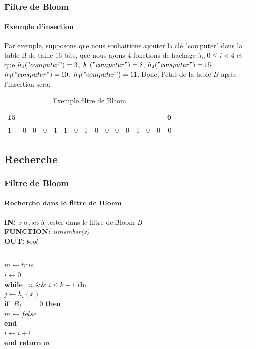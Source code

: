 \documentclass[hyperref={pdfpagemode=FullScreen,colorlinks=true},xcolor=pst,dvips]{beamer}\usepackage[french]{babel}
\begin{document}
	\begin{frame}
		\frametitle{Filtre de Bloom}
		\framesubtitle{Exemple d'insertion}
		Par exemple, supposons que nous souhaitions ajouter la clé "computer" dans la table B de taille 16 bits, que nous ayons 4 fonctions de hachage $ h_i, 0 \leq i < 4 $ et que $ h_0("computer") = 3$, $ h_1("computer") = 8$, $ h_2("computer") = 15$, $h_3("computer") = 10$, $h_4("computer") = 11 $. Donc, l'état de la table $ B $ après l'insertion sera:
	\begin{table}[!h]
		\centering		
		\begin{tabular}{|l|*{14}{c|}r|}
		\multicolumn{1}{c}{{\scriptsize 15}} &\multicolumn{1}{c}{}&\multicolumn{1}{c}{}&\multicolumn{1}{c}{}&\multicolumn{1}{c}{}&\multicolumn{1}{c}{}&\multicolumn{1}{c}{}&\multicolumn{1}{c}{}&\multicolumn{1}{c}{}&\multicolumn{1}{c}{}&\multicolumn{1}{c}{}&\multicolumn{1}{c}{}&\multicolumn{1}{c}{}&\multicolumn{1}{c}{}&\multicolumn{1}{c}{}&\multicolumn{1}{c}{{\scriptsize 0}}\\
		\hline
			1 & 0 & 0 & 0 & 1 & 1 & 0 & 1 & 0 & 0 & 0 & 0 & 1 & 0 & 0 & 0 \\
		\hline
		\end{tabular}
		\caption{Exemple filtre de Bloom}
	\end{table}
	\end{frame}
	\subsection{Recherche}
	\begin{frame}[shrink]
		\frametitle{Filtre de Bloom}
		\framesubtitle{Recherche dans le filtre de Bloom}
		\begin{framed}
		\textbf{IN:} \emph{x} objet à tester dans le filtre de Bloom \textit{B}\\
		\textbf{FUNCTION:} \textit{ismember(x)}\\
		\textbf{OUT:} $bool$

		\noindent\rule{\linewidth}{0.5pt}

		\begin{tabbing}
			$m \leftarrow true$\\
			$i \leftarrow 0$\\
			\textbf{while} \= $m$ \&\& $i \leq k - 1$ \textbf{do}\\
					\> $j \leftarrow h_i(x)$\\
					\> \textbf{if} \= $B_j == 0$ \textbf{then}\\
					\> \> $m \leftarrow false$\\
					\> \textbf{end}\\
					\> $i \leftarrow i + 1$\\
			\textbf{end}
			\textbf{return} $m$\\
	    	\end{tabbing}		
	\end{framed}
	\end{frame}
	
\end{document}
